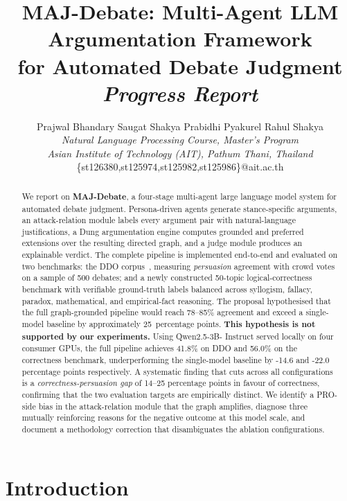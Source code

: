 \documentclass[11pt,twocolumn,letterpaper]{article}
\title{MAJ-Debate: Multi-Agent LLM Argumentation Framework\\
       for Automated Debate Judgment\\[0.3em]
       {\large\normalfont\itshape Progress Report}}
\author{Prajwal Bhandary \quad Saugat Shakya \quad Prabidhi Pyakurel \quad Rahul Shakya \\[0.3em]
        {\small\itshape Natural Language Processing Course, Master's Program} \\
        {\small\itshape Asian Institute of Technology (AIT), Pathum Thani, Thailand} \\
        {\small\ttfamily \{st126380,st125974,st125982,st125986\}@ait.ac.th}}
\date{}
\newcommand{\HumanTestTopics}{50}
\newcommand{\FullAccLo}{78}
\newcommand{\FullAccHi}{85}
\newcommand{\TotalGain}{25}
\newcommand{\DDOSample}{500}
\newcommand{\DDOAccFull}{41.8}
\newcommand{\LogicAccFull}{56.0}
\newcommand{\DDOGap}{-14.6}
\newcommand{\LogicGap}{-22.0}
\begin{document}
\maketitle

\begin{abstract}
We report on \textbf{MAJ-Debate}, a four-stage multi-agent large
language model system for automated debate judgment. Persona-driven
agents generate stance-specific arguments, an attack-relation module
labels every argument pair with natural-language justifications, a
Dung argumentation engine computes grounded and preferred extensions
over the resulting directed graph, and a judge module produces an
explainable verdict. The complete pipeline is implemented
end-to-end and evaluated on two benchmarks: the DDO
corpus~\citep{durmus2019ddo}, measuring \emph{persuasion} agreement
with crowd votes on a sample of \DDOSample{} debates; and a newly
constructed \HumanTestTopics-topic logical-correctness benchmark with
verifiable ground-truth labels balanced across syllogism, fallacy,
paradox, mathematical, and empirical-fact reasoning. The proposal
hypothesised that the full graph-grounded pipeline would reach
\FullAccLo--\FullAccHi\% agreement and exceed a single-model baseline
by approximately \TotalGain{}~percentage points. \textbf{This
hypothesis is not supported by our experiments.} Using Qwen2.5-3B-%
Instruct served locally on four consumer GPUs, the full pipeline
achieves \DDOAccFull\% on DDO and \LogicAccFull\% on the correctness
benchmark, underperforming the single-model baseline by
\DDOGap{} and \LogicGap{} percentage points respectively. A
systematic finding that cuts across all configurations is a
\emph{correctness-persuasion gap} of 14--25 percentage points in
favour of correctness, confirming that the two evaluation targets are
empirically distinct. We identify a PRO-side bias in the
attack-relation module that the graph amplifies, diagnose three
mutually reinforcing reasons for the negative outcome at this model
scale, and document a methodology correction that disambiguates the
ablation configurations.
\end{abstract}

\section{Introduction}
\end{document}
